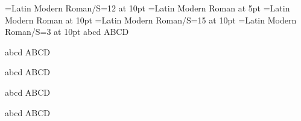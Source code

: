 

\font\testa={Latin Modern Roman/S=12} at 10pt
\font\testb={Latin Modern Roman}      at 5pt
\font\testc={Latin Modern Roman}      at 10pt
\font\testd={Latin Modern Roman/S=15} at 10pt
\font\teste={Latin Modern Roman/S=3}  at 10pt
\testa abcd ABCD \par
\testb abcd ABCD \par
\testc abcd ABCD \par
\testd abcd ABCD \par
\teste abcd ABCD \par
\bye
